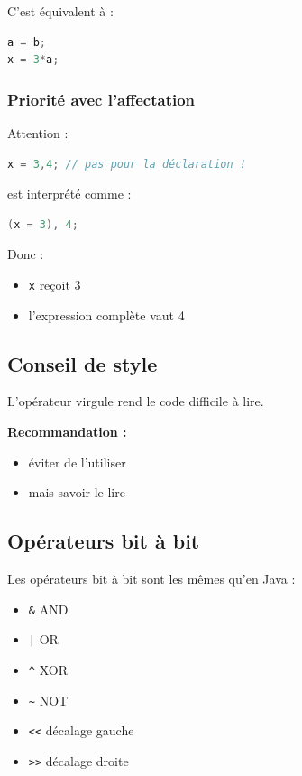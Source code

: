C’est équivalent à :

\begin{lstlisting}[language=C]
a = b;
x = 3*a;
\end{lstlisting}

\subsubsection{Priorité avec l’affectation}

Attention :

\begin{lstlisting}[language=C]
x = 3,4; // pas pour la déclaration !
\end{lstlisting}

est interprété comme :

\begin{lstlisting}[language=C]
(x = 3), 4;
\end{lstlisting}

Donc :

\begin{itemize}
    \item \texttt{x} reçoit 3
    \item l’expression complète vaut 4
\end{itemize}

\subsection{Conseil de style}

L’opérateur virgule rend le code difficile à lire.

\textbf{Recommandation :}
\begin{itemize}
    \item éviter de l’utiliser
    \item mais savoir le lire
\end{itemize}

\subsection{Opérateurs bit à bit}

Les opérateurs bit à bit sont les mêmes qu’en Java :

\begin{itemize}
    \item \texttt{\&} AND
    \item \texttt{|} OR
    \item \texttt{\^} XOR
    \item \texttt{\textasciitilde} NOT
    \item \texttt{<<} décalage gauche
    \item \texttt{>>} décalage droite
\end{itemize}

